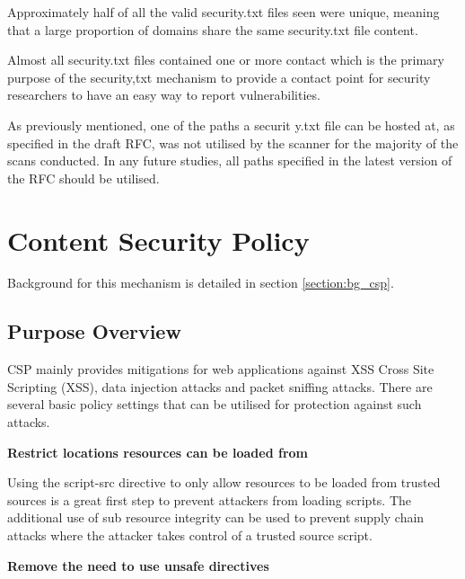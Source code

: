 \documentclass{mscreport}
\begin{document}
\vspace{0.3cm} \noindent
Approximately half  of all the valid security.txt files seen were unique, meaning that a large proportion of domains share the same security.txt file content.

\vspace{0.3cm} \noindent
Almost all security.txt files contained one or more contact which is the primary purpose of the security,txt mechanism to provide a contact point for security researchers to have an easy way to report  vulnerabilities.

\vspace{0.3cm} \noindent
As previously mentioned, one of the paths a securit y.txt file can be hosted at, as specified in the draft RFC, was not utilised by the scanner for the majority of the scans conducted. In any future studies, all paths specified in the latest version of the RFC should be utilised.

\newpage

\section{Content Security Policy}
\label{section:ana_csp}

Background for this mechanism is detailed in section \ref{section:bg_csp}.

\subsection{Purpose Overview}

CSP mainly provides mitigations for web applications against XSS Cross Site Scripting (XSS), data injection attacks and packet sniffing attacks. There are several basic policy settings that can be utilised for protection against such attacks.

\vspace{0.5cm} \noindent
\textbf{Restrict locations resources can be loaded from}

\vspace{0.3cm} \noindent
Using the script-src directive to only allow resources to be loaded from trusted sources is a great first step to prevent attackers from loading scripts. The additional use of sub resource integrity can be used to prevent supply chain attacks where the attacker takes control of a trusted source script.

\vspace{0.5cm} \noindent
\textbf{Remove the need to use unsafe directives}
\end{document}
